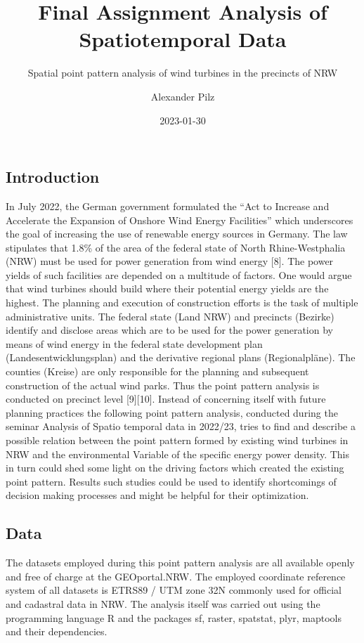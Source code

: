\documentclass[
]{article}
\title{Final Assignment Analysis of Spatiotemporal Data}
\subtitle{Spatial point pattern analysis of wind turbines in the
precincts of NRW}
\author{Alexander Pilz}
\date{2023-01-30}
\begin{document}
\maketitle

{
\setcounter{tocdepth}{2}
\tableofcontents
}
\hypertarget{introduction}{%
\subsection{Introduction}\label{introduction}}

In July 2022, the German government formulated the ``Act to Increase and
Accelerate the Expansion of Onshore Wind Energy Facilities'' which
underscores the goal of increasing the use of renewable energy sources
in Germany. The law stipulates that 1.8\% of the area of the federal
state of North Rhine-Westphalia (NRW) must be used for power generation
from wind energy {[}8{]}. The power yields of such facilities are
depended on a multitude of factors. One would argue that wind turbines
should build where their potential energy yields are the highest. The
planning and execution of construction efforts is the task of multiple
administrative units. The federal state (Land NRW) and precincts
(Bezirke) identify and disclose areas which are to be used for the power
generation by means of wind energy in the federal state development plan
(Landesentwicklungsplan) and the derivative regional plans
(Regionalpläne). The counties (Kreise) are only responsible for the
planning and subsequent construction of the actual wind parks. Thus the
point pattern analysis is conducted on precinct level {[}9{]}{[}10{]}.
Instead of concerning itself with future planning practices the
following point pattern analysis, conducted during the seminar Analysis
of Spatio temporal data in 2022/23, tries to find and describe a
possible relation between the point pattern formed by existing wind
turbines in NRW and the environmental Variable of the specific energy
power density. This in turn could shed some light on the driving factors
which created the existing point pattern. Results such studies could be
used to identify shortcomings of decision making processes and might be
helpful for their optimization.

\hypertarget{data}{%
\subsection{Data}\label{data}}

The datasets employed during this point pattern analysis are all
available openly and free of charge at the GEOportal.NRW. The employed
coordinate reference system of all datasets is ETRS89 / UTM zone 32N
commonly used for official and cadastral data in NRW. The analysis
itself was carried out using the programming language R and the packages
sf, raster, spatstat, plyr, maptools and their dependencies.
\end{document}
